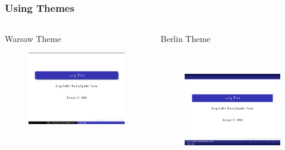 \documentclass[[newPxFont]{beamer}
\begin{document}
\subsection{}
\begin{frame}
  \frametitle{Using Themes}
\begin{columns}
  \begin{column}{.5\textwidth}
\begin{block}{Warsaw Theme}
\begin{figure}[ht]
    \centering
    \includegraphics[width=2in,height=2.in]{figs/warsaw.png}
 \end{figure}
 \end{block}
  \end{column}
  \begin{column}{.5\textwidth}
\begin{block}{Berlin Theme}
    \begin{figure}[ht]
    \centering
    \includegraphics[width=2in,height=2in]{figs/berlin.png}
  \end{figure}
  \end{block}
  \end{column}
\end{columns}
  \end{frame}
\end{document}
